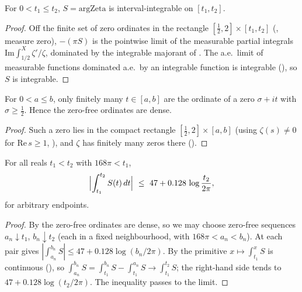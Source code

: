 \begin{lemma}
\label{lem:le_argZeta_int}
\leanok
For $0<t_1\le t_2$, $S=\mathrm{argZeta}$ is interval-integrable on $[t_1,t_2]$.
\end{lemma}

\begin{proof}
\leanok
Off the finite set of zero ordinates in the rectangle $[\tfrac12,2]\times[t_1,t_2]$
(, measure zero), $-(\pi S)$ is the
pointwise limit of the measurable partial integrals $\mathrm{Im}\int_{1/2}^{X}\zeta'/\zeta$,
dominated by the integrable majorant of
. The a.e.\ limit of
measurable functions dominated a.e.\ by an integrable function is integrable
(), so $S$ is integrable.
\end{proof}

\begin{lemma}
\label{lem:le_zerofree_dense}
\leanok
For $0<a\le b$, only finitely many $t\in[a,b]$ are the ordinate of a zero $\sigma+it$ with
$\sigma\ge\tfrac12$. Hence the zero-free ordinates are dense.
\end{lemma}

\begin{proof}
\leanok
Such a zero lies in the compact rectangle $[\tfrac12,2]\times[a,b]$ (using
$\zeta(s)\neq0$ for $\mathrm{Re}\,s\ge1$, ), and
$\zeta$ has finitely many zeros there
().
\end{proof}

\begin{theorem}
\label{thm:le_concrete_unconditional}
\leanok
{}
For all reals $t_1<t_2$ with $168\pi<t_1$,
\[
  \Bigl|\int_{t_1}^{t_2}S(t)\,dt\Bigr|\ \le\ 47+0.128\,\log\frac{t_2}{2\pi},
\]
for arbitrary endpoints.
\end{theorem}

\begin{proof}
\leanok
By  the zero-free ordinates are dense, so we may choose zero-free
sequences $a_n\downarrow t_1$, $b_n\downarrow t_2$ (each in a fixed neighbourhood, with
$168\pi<a_n<b_n$). At each pair  gives
$|\int_{a_n}^{b_n}S|\le47+0.128\log(b_n/2\pi)$. By  the primitive
$x\mapsto\int_{t_1}^{x}S$ is continuous (),
so $\int_{a_n}^{b_n}S=\int_{t_1}^{b_n}S-\int_{t_1}^{a_n}S\to\int_{t_1}^{t_2}S$; the right-hand
side tends to $47+0.128\log(t_2/2\pi)$. The inequality passes to the limit.
\end{proof}

